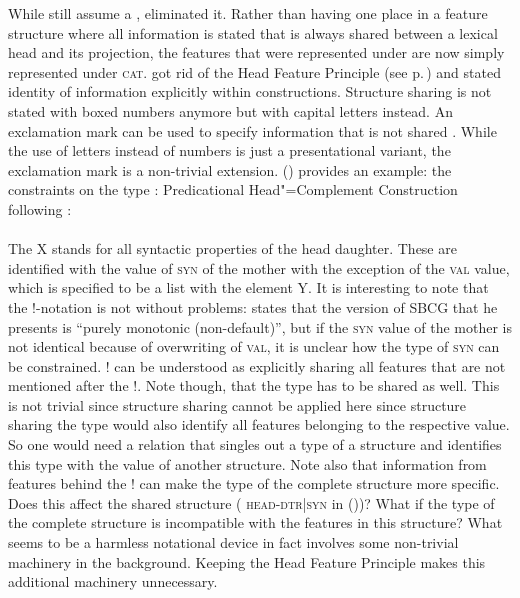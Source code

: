 \largerpage
While \citet{SWB2003a} still assume a \headf, \citet{Sag2012a} eliminated it. Rather than having one
place in a feature structure where all information is stated that is always shared between a lexical
head and its projection, the features that were represented under \head are now simply represented
under \textsc{cat}. \citet{Sag2012a} got rid of the Head Feature Principle (see
p.\,\pageref{prinzip-hfp}) and stated identity of information explicitly within constructions. Structure sharing is
not stated with boxed numbers anymore but with capital letters instead. An exclamation mark can be used to
specify information that is not shared \citep[]{Sag2012a}. While the use of letters instead
of numbers is just a presentational variant, the exclamation mark is a non-trivial
extension. () provides an example: the constraints on the type :
\eas
Predicational Head"=Complement Construction following \citet[]{Sag2012a}:\\
 \impl\\
\zs
The X stands for all syntactic properties of the head daughter. These are identified with the
value of \textsc{syn} of the mother with the exception of the \textsc{val} value, which is specified
to be a list with the element Y. It is interesting to note that the !-notation is not without
problems: \citet[]{Sag2012a} states that the version of SBCG that he presents is ``purely
monotonic (non-default)'', but if the \textsc{syn} value of the mother is not identical because of
overwriting of \textsc{val}, it is unclear how the type of \textsc{syn} can be constrained. ! can be
understood as explicitly sharing all features that are not mentioned after the !. Note though, that
the type has to be shared as well. This is not trivial since structure sharing cannot be applied
here since structure sharing the type would also identify all features belonging to the respective
value. So one would need a relation that singles out a type of a structure and identifies this type
with the value of another structure. Note also that information from features behind the ! can make
the type of the complete structure more specific. Does this affect the shared structure (\eg
\textsc{head-dtr|syn} in ())? What if the
type of the complete structure is incompatible with the features in this structure? What seems to be a harmless notational device in fact involves some
non-trivial machinery in the background. Keeping the Head Feature Principle makes this additional machinery
unnecessary. 
%


